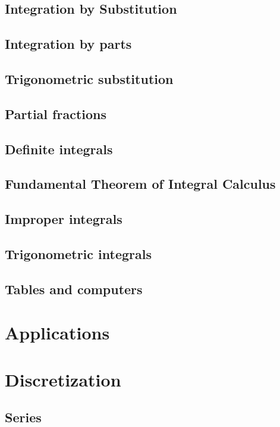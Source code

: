 \documentclass[twoside,openright,titlepage,a4paper]{book}
\begin{document}
\begin{sloppypar}
\section{Integration by Substitution} \label{ChIntegrationSecIntegrationBySubstitution}
\section{Integration by parts} \label{ChIntegrationSecIntegrationByParts}
\section{Trigonometric substitution} \label{ChIntegrationSecTrigonometricSubstitution}
\section{Partial fractions} \label{ChIntegrationSecPartialFractions}
\section{Definite integrals} \label{ChIntegrationSecDefiniteIntegrals}
\section{Fundamental Theorem of Integral Calculus} \label{ChIntegrationSecFundamentalTheoremOfIntegralCalculus}
\section{Improper integrals} \label{ChIntegrationSecImproperIntegrals}
\section{Trigonometric integrals} \label{ChIntegrationSecTrigonometricIntegrals}
\section{Tables and computers} \label{ChIntegrationSecTablesAndComputers}

\chapter{Applications} \label{ChApplications}

\chapter{Discretization} \label{ChDiscretization}
\section{Series} \label{ChDiscretizationSecSeries}

\end{sloppypar}
\end{document}
